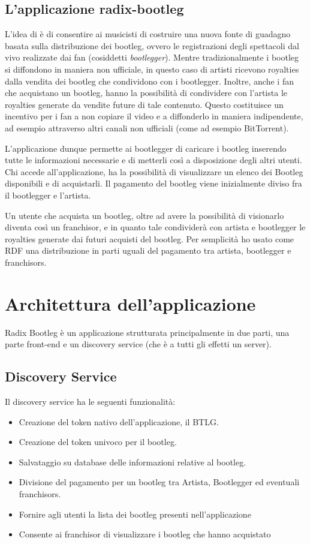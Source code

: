 \subsection{L'applicazione radix-bootleg}

L'idea di è di consentire ai musicisti di costruire una nuova fonte di guadagno basata sulla distribuzione dei bootleg, ovvero le registrazioni degli spettacoli dal vivo realizzate dai fan (cosiddetti \textit{bootlegger}). Mentre tradizionalmente i bootleg si diffondono in maniera non ufficiale, in questo caso di artisti ricevono royalties dalla vendita dei bootleg che condividono con i bootlegger. Inoltre, anche i fan che acquistano un bootleg, hanno la possibilità di condividere con l'artista le royalties generate da vendite future di tale contenuto. Questo costituisce un incentivo per i fan a non copiare il video e a diffonderlo in maniera indipendente, ad esempio attraverso altri canali non ufficiali (come ad esempio BitTorrent).

L'applicazione dunque permette ai bootlegger di caricare i bootleg inserendo tutte le informazioni necessarie e di metterli così a disposizione degli altri utenti. Chi accede all'applicazione, ha la possibilità di visualizzare un elenco dei Bootleg disponibili e di acquistarli. Il pagamento del bootleg viene inizialmente diviso fra il bootlegger e l'artista. 

Un utente che acquista un bootleg, oltre ad avere la possibilità di visionarlo diventa così un franchisor, e in quanto tale condividerà con artista e bootlegger le royalties generate dai futuri acquisti del bootleg. Per semplicità ho usato come RDF una distribuzione in parti uguali del pagamento tra artista, bootlegger e franchisors.

\section{Architettura dell'applicazione}

Radix Bootleg è un applicazione strutturata principalmente in due parti, una parte front-end e un discovery service (che è a tutti gli effetti un server).

\subsection{Discovery Service}

Il discovery service ha le seguenti funzionalità:
\begin{itemize}
    \item Creazione del token nativo dell'applicazione, il BTLG.
    \item Creazione del token univoco per il bootleg.
    \item Salvataggio su database delle informazioni relative al bootleg.
    \item Divisione del pagamento per un bootleg tra Artista, Bootlegger ed eventuali franchisors.
    \item Fornire agli utenti la lista dei bootleg presenti nell'applicazione
    \item Consente ai franchisor di visualizzare i bootleg che hanno acquistato
\end{itemize}

